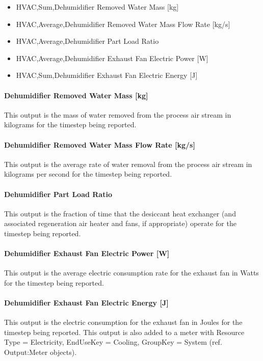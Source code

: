 \begin{itemize}
\item
  HVAC,Sum,Dehumidifier Removed Water Mass {[}kg{]}
\item
  HVAC,Average,Dehumidifier Removed Water Mass Flow Rate {[}kg/s{]}
\item
  HVAC,Average,Dehumidifier Part Load Ratio \protect\hyperlink{section-1}{}
\item
  HVAC,Average,Dehumidifier Exhaust Fan Electric Power {[}W{]}
\item
  HVAC,Sum,Dehumidifier Exhaust Fan Electric Energy {[}J{]}
\end{itemize}

\paragraph{Dehumidifier Removed Water Mass {[}kg{]}}\label{dehumidifier-removed-water-mass-kg-1}

This output is the mass of water removed from the process air stream in kilograms for the timestep being reported.

\paragraph{Dehumidifier Removed Water Mass Flow Rate {[}kg/s{]}}\label{dehumidifier-removed-water-mass-flow-rate-kgs-1}

This output is the average rate of water removal from the process air stream in kilograms per second for the timestep being reported.

\paragraph{\texorpdfstring{Dehumidifier Part Load Ratio \protect\hyperlink{section-1}{}}{Dehumidifier Part Load Ratio }}\label{dehumidifier-part-load-ratio-1}

This output is the fraction of time that the desiccant heat exchanger (and associated regeneration air heater and fans, if appropriate) operate for the timestep being reported.

\paragraph{Dehumidifier Exhaust Fan Electric Power {[}W{]}}\label{dehumidifier-exhaust-fan-electric-power-w}

This output is the average electric consumption rate for the exhaust fan in Watts for the timestep being reported.

\paragraph{Dehumidifier Exhaust Fan Electric Energy {[}J{]}}\label{dehumidifier-exhaust-fan-electric-energy-j}

This output is the electric consumption for the exhaust fan in Joules for the timestep being reported. This output is also added to a meter with Resource Type = Electricity, EndUseKey = Cooling, GroupKey = System (ref. Output:Meter objects).
